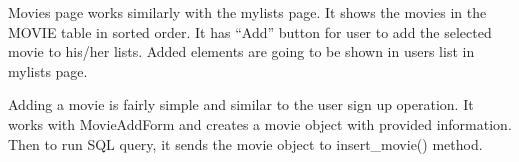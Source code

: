 \documentclass[letterpaper,10pt,english]{sphinxmanual}
\begin{document}
Movies page works similarly with the mylists page. It shows the movies in the MOVIE table in sorted order.
It has “Add” button for user to add the selected movie to his/her lists.
Added elements are going to be shown in users list in mylists page.

\begin{sphinxVerbatim}[commandchars=\\\{\}]
 
      

       
          \PYG{p}{[}\PYG{p}{]}
          \PYG{p}{[}\PYG{p}{]}
         
         

      
\end{sphinxVerbatim}

Adding a movie is fairly simple and similar to the user sign up operation.
It works with MovieAddForm and creates a movie object with provided information.
Then to run SQL query, it sends the movie object to insert\_movie() method.
\end{document}
